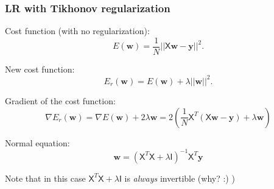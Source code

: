 \documentclass{beamer}
\begin{document}
	\begin{frame}
		\frametitle{LR with Tikhonov regularization}
		Cost function (with no regularization):
		\begin{equation*}
			E(\bm{w}) = \frac{1}{N} ||\mathsf{X} \bm{w} - \bm{y}||^2.
		\end{equation*}
		
		New cost function:
		\begin{equation*}
			E_{r}(\bm{w}) = E(\bm{w}) + \lambda ||\bm{w}||^2.
		\end{equation*}
		
		Gradient of the cost function:
		\begin{equation*}
			\nabla E_r(\bm{w}) = \nabla E(\bm{w}) + 2 \lambda \bm{w} = 2(\frac{1}{N}\mathsf{X}^T(\mathsf{X}\bm{w} - \bm{y}) + \lambda \bm{w})
		\end{equation*}
	
		Normal equation:
		\begin{equation*}
			\bm{w} = (\mathsf{X}^T\mathsf{X} + \lambda \mathsf{I})^{-1}\mathsf{X}^T\bm{y}
		\end{equation*}
	
	Note that in this case $\mathsf{X}^T\mathsf{X} + \lambda \mathsf{I}$ is \textsl{always} invertible (why? :) )
	\end{frame}
\end{document}
